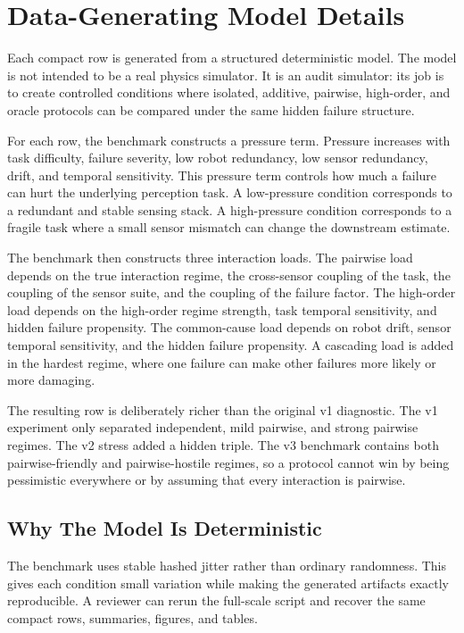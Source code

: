\documentclass{article}
\begin{document}
\section{Data-Generating Model Details}

Each compact row is generated from a structured deterministic model. The model is not intended to be a real physics simulator. It is an audit simulator: its job is to create controlled conditions where isolated, additive, pairwise, high-order, and oracle protocols can be compared under the same hidden failure structure.

For each row, the benchmark constructs a pressure term. Pressure increases with task difficulty, failure severity, low robot redundancy, low sensor redundancy, drift, and temporal sensitivity. This pressure term controls how much a failure can hurt the underlying perception task. A low-pressure condition corresponds to a redundant and stable sensing stack. A high-pressure condition corresponds to a fragile task where a small sensor mismatch can change the downstream estimate.

The benchmark then constructs three interaction loads. The pairwise load depends on the true interaction regime, the cross-sensor coupling of the task, the coupling of the sensor suite, and the coupling of the failure factor. The high-order load depends on the high-order regime strength, task temporal sensitivity, and hidden failure propensity. The common-cause load depends on robot drift, sensor temporal sensitivity, and the hidden failure propensity. A cascading load is added in the hardest regime, where one failure can make other failures more likely or more damaging.

The resulting row is deliberately richer than the original v1 diagnostic. The v1 experiment only separated independent, mild pairwise, and strong pairwise regimes. The v2 stress added a hidden triple. The v3 benchmark contains both pairwise-friendly and pairwise-hostile regimes, so a protocol cannot win by being pessimistic everywhere or by assuming that every interaction is pairwise.

\subsection{Why The Model Is Deterministic}

The benchmark uses stable hashed jitter rather than ordinary randomness. This gives each condition small variation while making the generated artifacts exactly reproducible. A reviewer can rerun the full-scale script and recover the same compact rows, summaries, figures, and tables.
\end{document}
